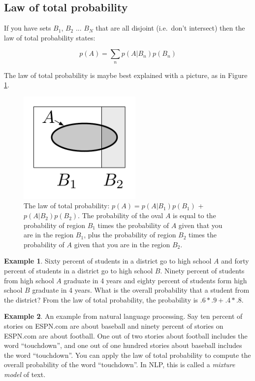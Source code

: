 \documentclass[]{article}
\theoremstyle{definition}
\newtheorem{exmp}{Example}[section]
\begin{document}

\subsection{Law of total probability}

If you have sets $B_1$, $B_2$ ... $B_N$ that are all disjoint (i.e.\ don't intersect) then the law of total probability states: 

\[p(A) = \sum\limits_{n} p(A|B_n)p(B_n)\]

The law of total probability is maybe best explained with a picture, as in Figure \ref{f:total_prob}.

\begin{figure}[!ht]
     \centering
     \includegraphics[width=6cm]{total_probability}
     \caption{The law of total probability: $p(A) = p(A|B_1)p(B_1)$ + $p(A|B_2)p(B_2)$. The probability of the oval $A$ is equal to the probability of region $B_1$ times the probability of $A$ given that you are in the region $B_1$, plus the probability of region $B_2$ times the probability of $A$ given that you are in the region $B_2$. }\label{f:total_prob}
\end{figure}

\begin{exmp}
Sixty percent of students in a district go to high school $A$ and forty percent of students in a district go to high school $B$. Ninety percent of students from high school $A$ graduate in 4 years and eighty percent of students form high school $B$ graduate in 4 years. What is the overall probability that a student from the district? From the law of total probability, the probability is $.6 * .9 + .4*.8$.
\end{exmp} 

\begin{exmp}
An example from natural language processing. Say ten percent of stories on ESPN.com are about baseball and ninety percent of stories on ESPN.com are about football. One out of two stories about football includes the word ``touchdown'', and one out of one hundred stories about baseball includes the word ``touchdown''. You can apply the law of total probability to compute the overall probability of the word ``touchdown''. In NLP, this is called a \textit{mixture model} of text.
\end{exmp} 
\end{document}
